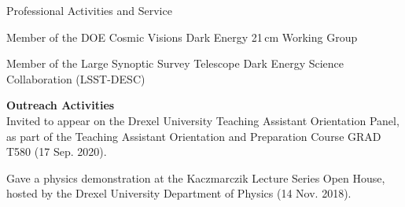 \documentclass{resume} %
\begin{document}

\begin{rSection}{Professional Activities and Service}

\begin{description}[leftmargin=10em, style=nextline]

\item[Working Groups] Member of the DOE Cosmic Visions Dark Energy 21$\,$cm Working 
 Group

\item[Collaborations] Member of the Large Synoptic Survey Telescope Dark Energy 
 Science Collaboration (LSST-DESC)

\end{description}

\textbf{Outreach Activities}\\
Invited to appear on the Drexel University Teaching Assistant Orientation Panel, as part of the Teaching Assistant Orientation and Preparation Course GRAD T580 (17 Sep. 2020).

Gave a physics demonstration at the Kaczmarczik Lecture Series Open House, hosted by the Drexel University Department of Physics (14 Nov. 2018).

\end{rSection}



%
%


\end{document}
